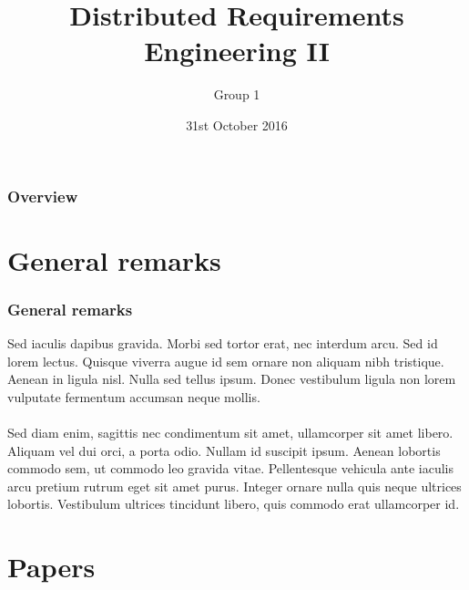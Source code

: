 \documentclass{beamer}
\title[Distributed RE II]{Distributed Requirements Engineering II} %
\author{Group 1}
\date{31st October 2016}
\begin{document}
\begin{frame}
\titlepage
\end{frame}

\begin{frame}
\frametitle{Overview} %
\tableofcontents %
\end{frame}


\section{General remarks}
\begin{frame}
\frametitle{General remarks}
Sed iaculis dapibus gravida. Morbi sed tortor erat, nec interdum arcu. Sed id lorem lectus. Quisque viverra augue id sem ornare non aliquam nibh tristique. Aenean in ligula nisl. Nulla sed tellus ipsum. Donec vestibulum ligula non lorem vulputate fermentum accumsan neque mollis.\\~\\

Sed diam enim, sagittis nec condimentum sit amet, ullamcorper sit amet libero. Aliquam vel dui orci, a porta odio. Nullam id suscipit ipsum. Aenean lobortis commodo sem, ut commodo leo gravida vitae. Pellentesque vehicula ante iaculis arcu pretium rutrum eget sit amet purus. Integer ornare nulla quis neque ultrices lobortis. Vestibulum ultrices tincidunt libero, quis commodo erat ullamcorper id.
\end{frame}


\section{Papers}
\end{document}
